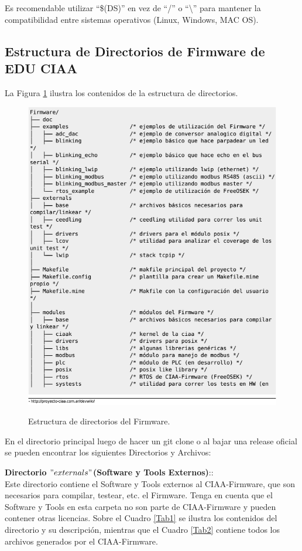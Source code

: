 \documentclass[12pt,letterpaper]{article}
\begin{document}
Es recomendable utilizar ``\$(DS)'' en vez de ``/'' o ``\textbackslash{}'' para mantener la compatibilidad entre sistemas operativos (Linux, Windows, MAC OS).
{
\subsection{Estructura de Directorios de Firmware de EDU CIAA}
La Figura \ref{Fig3} ilustra los contenidos de la estructura de directorios.
\begin{figure}[H]
\centering
\includegraphics[width=10 cm]{figuras/est_directorios_ciaa.png}\\
\caption{Estructura de directorios del Firmware.}
\label{Fig3}
\end{figure}

En el directorio principal luego de hacer un git clone o al bajar una release oficial se pueden encontrar los siguientes Directorios y Archivos:

\textbf{Directorio $"externals"$(Software y Tools Externos)}::
 \\
 
Este directorio contiene el Software y Tools externos al CIAA-Firmware, que son necesarios para compilar, testear, etc. el Firmware. Tenga en cuenta que el Software y Tools en esta carpeta no son parte de CIAA-Firmware y pueden contener otras licencias. Sobre el Cuadro \ref{Tab1} se ilustra los contenidos del directorio y su descripción, mientras que el Cuadro \ref{Tab2} contiene todos los archivos generados por el CIAA-Firmware.
\begin{table}[H]


\end{table}}
\end{document}
